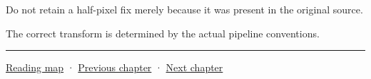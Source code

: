 Do not retain a half-pixel fix merely because it was present in the original source.

The correct transform is determined by the actual pipeline conventions.

\begin{center}\rule{0.5\linewidth}{0.5pt}\end{center}

\hyperref[volume-reading-map]{Reading map} · \hyperref[02-foundations-ii-ch032-geometry-becomes-an-image-and-an-inverse-problem]{Previous chapter} · \hyperref[02-foundations-ii-ch034-robust-predicates-and-camera-sensitivity]{Next chapter}
